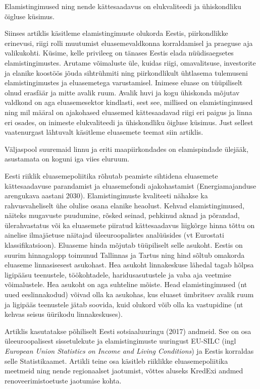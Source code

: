 \documentclass[estonian,]{article}
\begin{document}
\begin{blockquote-right}
Elamistingimused ning nende kättesaadavus on elukvaliteedi ja
ühiskondliku õigluse küsimus.
\end{blockquote-right}

Siinses artiklis käsitleme elamistingimuste olukorda Eestis, piirkondlikke erinevusi, riigi rolli muutumist eluasemevaldkonna korraldamisel ja praeguse aja valikukohti. Küsime, kelle privileeg on tänases Eestis elada nüüdisaegsetes elamistingimustes. Arutame võimaluste üle, kuidas riigi, omavalitsuse, investorite ja elanike koostöös jõuda sihtrühmiti ning piirkondlikult ühtlasema tulemuseni elamistingimustes ja eluasemetega varustamisel. Inimese eluase on tüüpiliselt olnud erasfäär ja mitte avalik ruum. Avalik huvi ja kogu ühiskonda mõjutav valdkond on aga eluasemesektor kindlasti, sest see, millised on elamistingimused ning mil määral on ajakohased eluasemed kättesaadavad riigi eri paigus ja linna eri osades, on inimeste elukvaliteedi ja ühiskondliku õigluse küsimus. Just sellest vaatenurgast lähtuvalt käsitleme eluasemete teemat siin artiklis.

\begin{blockquote-right}
Väljaspool suuremaid linnu ja eriti maapiirkondades on elamispindade
ülejääk, asustamata on koguni iga viies eluruum.
\end{blockquote-right}

Eesti riiklik eluasemepoliitika rõhutab peamiste sihtidena eluasemete kättesaadavuse parandamist ja eluasemefondi ajakohastamist (Energiamajanduse arengukava aastani 2030). Elamistingimuste kvaliteeti nähakse ka rahvusvaheliselt ühe olulise osana elanike heaolust. Kehvad elamistingimused, näiteks mugavuste puudumine, rõsked seinad, pehkinud aknad ja põrandad, ülerahvastatus või ka eluasemete piiratud kättesaadavus liigkõrge hinna tõttu on ainelise ilmajäetuse näitajad üleeuroopalistes analüüsides (vt Eurostati klassifikatsioon). Eluaseme hinda mõjutab tüüpiliselt selle asukoht. Eestis on suurim hinnagalopp toimunud Tallinnas ja Tartus ning hind sõltub omakorda eluaseme linnasisesest asukohast. Hea asukoht linnakeskuse lähedal tagab hõlpsa ligipääsu teenustele, töökohtadele, haridusasutustele ja vaba aja veetmise võimalustele. Hea asukoht on aga suhteline mõiste. Head elamistingimused (nt uued eeslinnakodud) võivad olla ka asukohas, kus eluaset ümbritsev avalik ruum ja ligipääs teenustele jätab soovida, kuid olukord võib olla ka vastupidine (nt kehvas seisus üürikodu linnakeskuses).

Artiklis kasutatakse põhiliselt Eesti sotsiaaluuringu (2017) andmeid. See on osa üleeuroopalisest sissetulekute ja elamistingimuste uuringust EU-SILC (ingl \emph{European Union Statistics on Income and Living Conditions}) ja Eestis korraldas selle Statistikaamet. Artikli teine osa käsitleb riiklikke eluasemepoliitika meetmeid ning nende regionaalset jaotumist, võttes aluseks KredExi andmed renoveerimistoetuste jaotumise kohta.
\end{document}
